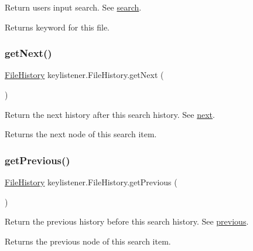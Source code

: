 Return user\textquotesingle{}s input search. See \hyperlink{classkeylistener_1_1_file_history_a6370f7f80f43860c1da4962b9e0a3f01}{search}. \begin{DoxyReturn}{Returns}
keyword for this file. 
\end{DoxyReturn}
\mbox{\label{classkeylistener_1_1_file_history_a6a27d9d0c37dd7cc422bd6bd6ca709be}} 
\subsubsection{\texorpdfstring{get\+Next()}{getNext()}}
{\footnotesize\ttfamily \hyperlink{classkeylistener_1_1_file_history}{File\+History} keylistener.\+File\+History.\+get\+Next (\begin{DoxyParamCaption}{ }\end{DoxyParamCaption})\hspace{0.3cm}{\ttfamily [inline]}}

Return the next history after this search history. See \hyperlink{classkeylistener_1_1_file_history_aa9571ba3eabdcc6b9e7d152a0a7537ee}{next}. \begin{DoxyReturn}{Returns}
the next node of this search item. 
\end{DoxyReturn}
\mbox{\label{classkeylistener_1_1_file_history_ae89875744c0f07e59f8e2087c985901c}} 
\subsubsection{\texorpdfstring{get\+Previous()}{getPrevious()}}
{\footnotesize\ttfamily \hyperlink{classkeylistener_1_1_file_history}{File\+History} keylistener.\+File\+History.\+get\+Previous (\begin{DoxyParamCaption}{ }\end{DoxyParamCaption})\hspace{0.3cm}{\ttfamily [inline]}}

Return the previous history before this search history. See \hyperlink{classkeylistener_1_1_file_history_ab08fec8e2a293a9000087d18e1454c44}{previous}. \begin{DoxyReturn}{Returns}
the previous node of this search item. 
\end{DoxyReturn}
\mbox{\label{classkeylistener_1_1_file_history_a25a150f439e4577a25b29fbf9f86f9b7}} 
